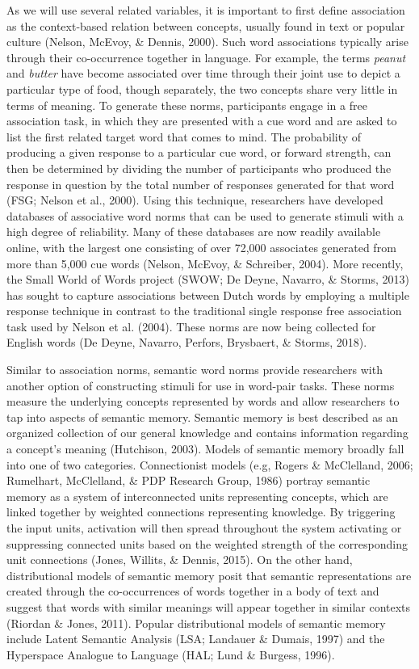 \documentclass[english,man]{apa6}
\theoremstyle{definition}
\theoremstyle{definition}
\theoremstyle{definition}
\theoremstyle{remark}
\begin{document}
As we will use several related variables, it is important to first
define association as the context-based relation between concepts,
usually found in text or popular culture (Nelson, McEvoy, \& Dennis,
2000). Such word associations typically arise through their
co-occurrence together in language. For example, the terms \emph{peanut}
and \emph{butter} have become associated over time through their joint
use to depict a particular type of food, though separately, the two
concepts share very little in terms of meaning. To generate these norms,
participants engage in a free association task, in which they are
presented with a cue word and are asked to list the first related target
word that comes to mind. The probability of producing a given response
to a particular cue word, or forward strength, can then be determined by
dividing the number of participants who produced the response in
question by the total number of responses generated for that word (FSG;
Nelson et al., 2000). Using this technique, researchers have developed
databases of associative word norms that can be used to generate stimuli
with a high degree of reliability. Many of these databases are now
readily available online, with the largest one consisting of over 72,000
associates generated from more than 5,000 cue words (Nelson, McEvoy, \&
Schreiber, 2004). More recently, the Small World of Words project (SWOW;
De Deyne, Navarro, \& Storms, 2013) has sought to capture associations
between Dutch words by employing a multiple response technique in
contrast to the traditional single response free association task used
by Nelson et al. (2004). These norms are now being collected for English
words (De Deyne, Navarro, Perfors, Brysbaert, \& Storms, 2018).

Similar to association norms, semantic word norms provide researchers
with another option of constructing stimuli for use in word-pair tasks.
These norms measure the underlying concepts represented by words and
allow researchers to tap into aspects of semantic memory. Semantic
memory is best described as an organized collection of our general
knowledge and contains information regarding a concept's meaning
(Hutchison, 2003). Models of semantic memory broadly fall into one of
two categories. Connectionist models (e.g, Rogers \& McClelland, 2006;
Rumelhart, McClelland, \& PDP Research Group, 1986) portray semantic
memory as a system of interconnected units representing concepts, which
are linked together by weighted connections representing knowledge. By
triggering the input units, activation will then spread throughout the
system activating or suppressing connected units based on the weighted
strength of the corresponding unit connections (Jones, Willits, \&
Dennis, 2015). On the other hand, distributional models of semantic
memory posit that semantic representations are created through the
co-occurrences of words together in a body of text and suggest that
words with similar meanings will appear together in similar contexts
(Riordan \& Jones, 2011). Popular distributional models of semantic
memory include Latent Semantic Analysis (LSA; Landauer \& Dumais, 1997)
and the Hyperspace Analogue to Language (HAL; Lund \& Burgess, 1996).
\end{document}

